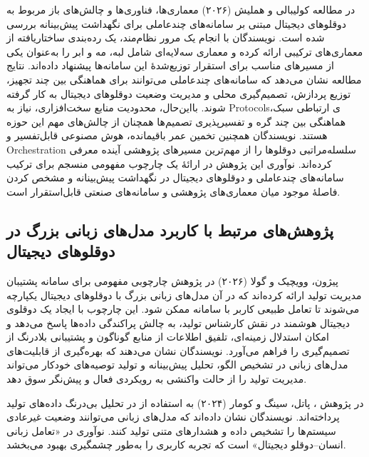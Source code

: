در مطالعه
کولیبالی و هملیش (۲۰۲۶)
\cite{coulibaly2026madtdt}
معماری‌ها، فناوری‌ها و چالش‌های باز مربوط به دوقلوهای دیجیتال مبتنی بر سامانه‌های چندعاملی برای نگهداشت پیش‌بینانه بررسی شده است. نویسندگان با انجام یک مرور نظام‌مند، یک رده‌بندی ساختاریافته از معماری‌های ترکیبی
ارائه کرده و معماری سه‌لایه‌ای شامل لبه، مه و ابر را به‌عنوان یکی از مسیرهای مناسب برای استقرار توزیع‌شدهٔ این سامانه‌ها پیشنهاد داده‌اند. نتایج مطالعه نشان می‌دهد که سامانه‌های چندعاملی می‌توانند برای هماهنگی بین چند تجهیز، توزیع پردازش، تصمیم‌گیری محلی و مدیریت وضعیت دوقلوهای دیجیتال به کار گرفته شوند. بااین‌حال، محدودیت منابع سخت‌افزاری، نیاز به \glspl{Protocol}ی ارتباطی سبک، هماهنگی بین چند گره و تفسیرپذیری تصمیم‌ها همچنان از چالش‌های مهم این حوزه هستند. نویسندگان همچنین تخمین عمر باقیمانده، هوش مصنوعی قابل‌تفسیر و \gls{Orchestration} سلسله‌مراتبی دوقلوها را از مهم‌ترین مسیرهای پژوهشی آینده معرفی کرده‌اند. نوآوری این پژوهش در ارائهٔ یک چارچوب مفهومی منسجم برای ترکیب سامانه‌های چندعاملی و دوقلوهای دیجیتال در نگهداشت پیش‌بینانه و مشخص کردن فاصلهٔ موجود میان معماری‌های پژوهشی و سامانه‌های صنعتی قابل‌استقرار است.









\subsection{پژوهش‌های مرتبط با کاربرد مدل‌های زبانی بزرگ در دوقلوهای دیجیتال}

پیژون، وویچیک و گولا (۲۰۲۶) در پژوهش 
\cite{Pizon2026integrating} چارچوبی مفهومی برای سامانه پشتیبان مدیریت تولید ارائه کرده‌اند که در آن مدل‌های زبانی بزرگ با دوقلوهای دیجیتال یکپارچه می‌شوند تا تعامل طبیعی کاربر با سامانه ممکن شود. این چارچوب با ایجاد یک دوقلوی دیجیتال هوشمند در نقش کارشناس تولید، به چالش پراکندگی داده‌ها پاسخ می‌دهد و امکان استدلال زمینه‌ای، تلفیق اطلاعات از منابع گوناگون و پشتیبانی بلادرنگ از تصمیم‌گیری را فراهم می‌آورد. نویسندگان نشان می‌دهند که بهره‌گیری از قابلیت‌های مدل‌های زبانی در تشخیص الگو، تحلیل پیش‌بینانه و تولید توصیه‌های خودکار می‌تواند مدیریت تولید را از حالت واکنشی به رویکردی فعال و پیش‌نگر سوق دهد.



در پژوهش \cite{patel2024llmdt}،
پاتل، سینگ و کومار (۲۰۲۴)
   به استفاده از  در تحلیل بی‌درنگ داده‌های تولید پرداخته‌اند. نویسندگان نشان داده‌اند که مدل‌های زبانی می‌توانند وضعیت غیرعادی سیستم‌ها را تشخیص داده و هشدارهای متنی تولید کنند. نوآوری در «تعامل زبانی انسان–دوقلو دیجیتال» است که تجربه کاربری را به‌طور چشمگیری بهبود می‌بخشد.



